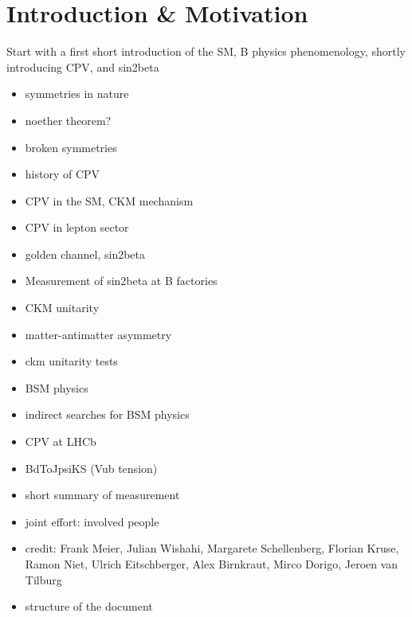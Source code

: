 
\chapter{Introduction \& Motivation}


Start with a first short introduction of the SM, B physics phenomenology, shortly introducing CPV, and sin2beta

\begin{itemize}
  \item symmetries in nature
  \item noether theorem?
  \item broken symmetries
  \item history of CPV
  \item CPV in the SM, CKM mechanism
  \item CPV in lepton sector
  \item golden channel, sin2beta
  \item Measurement of sin2beta at B factories
  \item CKM unitarity
  \item matter-antimatter asymmetry
  \item ckm unitarity tests
  \item BSM physics
  \item indirect searches for BSM physics
  \item CPV at LHCb
  \item BdToJpsiKS (Vub tension)
  \item short summary of measurement
  \item joint effort: involved people
  \item credit: Frank Meier, Julian Wishahi, Margarete Schellenberg, Florian Kruse, Ramon Niet, Ulrich Eitschberger, Alex Birnkraut, Mirco Dorigo, Jeroen van Tilburg
  \item structure of the document
\end{itemize}
